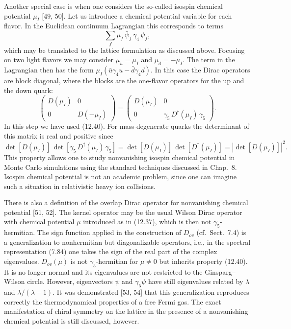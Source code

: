 Another special case is when one considers the so-called isospin chemical
potential $\mu_I$ [49, 50]. Let us introduce a chemical potential variable for
each flavor. In the Euclidean continuum Lagrangian this corresponds to terms
\begin{equation}
  \sum_f \mu_f\,\bar{\psi}_f\,\gamma_4\,\psi_f,
\end{equation}
which may be translated to the lattice formulation as discussed above.
Focusing on two light flavors we may consider $\mu_u = \mu_I$ and
$\mu_d = -\mu_I$. The term in the Lagrangian then has the form
$\mu_I(\bar{u}\gamma_4 u - \bar{d}\gamma_4 d)$. In this case the Dirac
operators are block diagonal, where the blocks are the one-flavor operators for
the up and the down quark:
\begin{equation}
  \begin{pmatrix} D(\mu_I) & 0 \\ 0 & D(-\mu_I) \end{pmatrix}
  =
  \begin{pmatrix} D(\mu_I) & 0 \\
                  0 & \gamma_5\,D^\dagger(\mu_I)\,\gamma_5 \end{pmatrix}.
\end{equation}
In this step we have used (12.40). For mass-degenerate quarks the determinant
of this matrix is real and positive since
\begin{equation}
  \det[D(\mu_I)]\,\det[\gamma_5\,D^\dagger(\mu_I)\,\gamma_5]
  = \det[D(\mu_I)]\,\det[D^\dagger(\mu_I)]
  = \left|\det[D(\mu_I)]\right|^2 .
\end{equation}
This property allows one to study nonvanishing isospin chemical potential in
Monte Carlo simulations using the standard techniques discussed in Chap.~8.
Isospin chemical potential is not an academic problem, since one can imagine
such a situation in relativistic heavy ion collisions.

There is also a definition of the overlap Dirac operator for nonvanishing
chemical potential [51, 52]. The kernel operator may be the usual Wilson Dirac
operator with chemical potential $\mu$ introduced as in (12.37), which is then
not $\gamma_5$-hermitian. The sign function applied in the construction of
$D_{ov}$ (cf.\ Sect.~7.4) is a generalization to nonhermitian but
diagonalizable operators, i.e., in the spectral representation (7.84) one takes
the sign of the real part of the complex eigenvalues. $D_{ov}(\mu)$ is not
$\gamma_5$-hermitian for $\mu \ne 0$ but inherits property (12.40). It is no
longer normal and its eigenvalues are not restricted to the Ginsparg--Wilson
circle. However, eigenvectors $\psi$ and $\gamma_5\psi$ have still eigenvalues
related by $\lambda$ and $\lambda/(\lambda - 1)$. It was demonstrated [53, 54]
that this generalization reproduces correctly the thermodynamical properties of
a free Fermi gas. The exact manifestation of chiral symmetry on the lattice in
the presence of a nonvanishing chemical potential is still discussed, however.

